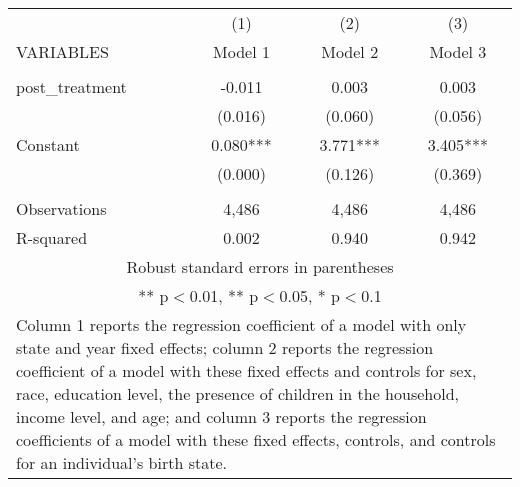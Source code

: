 \begin{tabular}{lccc}
\hline
 & (1) & (2) & (3) \\
VARIABLES & Model 1 & Model 2 & Model 3 \\ \hline
 &  &  &  \\
post\_treatment & -0.011 & 0.003 & 0.003 \\
 & (0.016) & (0.060) & (0.056) \\
Constant & 0.080*** & 3.771*** & 3.405*** \\
 & (0.000) & (0.126) & (0.369) \\
 &  &  &  \\
Observations & 4,486 & 4,486 & 4,486 \\
 R-squared & 0.002 & 0.940 & 0.942 \\ \hline
\multicolumn{4}{c}{\small Robust standard errors in parentheses} \\
\multicolumn{4}{c}{\small *** p$<$0.01, ** p$<$0.05, * p$<$0.1} \\
\multicolumn{4}{p{0.8\linewidth}}{\small Column 1 reports the
regression coefficient of a model with only state and year fixed effects; column 2 reports the
regression coefficient of a model with these fixed effects and controls for sex, race, education
level, the presence of children in the household, income level, and age; and column 3 reports
the regression coefficients of a model with these fixed effects, controls, and controls for an
individual’s birth state.} \\
\end{tabular}
